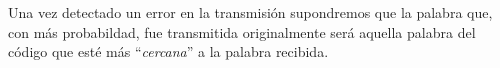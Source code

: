 Una vez detectado un error en la transmisi\'on supondremos que la palabra que,
con m\'as probabildad, fue transmitida originalmente ser\'a aquella palabra del
c\'odigo que est\'e m\'as ``\emph{cercana}'' a la palabra recibida.

%
%



%
%



%
%



%
%



%
%



%
%



%
%


